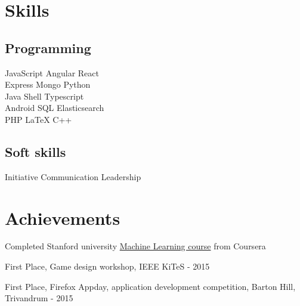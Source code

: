 \documentclass[]{font}
\begin{document}
%
%
\lastupdated

%
%

%
%

\begin{minipage}[t]{0.33\textwidth} 


\section{Skills}
\subsection{Programming}
JavaScript \textbullet{} Angular \textbullet{} React \\
Express \textbullet{}  Mongo \textbullet{} Python \\
Java \textbullet{} Shell \textbullet{} Typescript \\ 
Android \textbullet{} SQL \textbullet{} Elasticsearch \\
PHP \textbullet{} \LaTeX \textbullet{} C++\\
\sectionsep

\subsection{Soft skills}
Initiative \textbullet{} Communication \textbullet{} Leadership \\
\sectionsep


\section{Achievements} 
\vspace{\topsep}
\begin{tightemize}
\item Completed Stanford university \href{https://www.coursera.org/account/accomplishments/records/EJQWCKEBUSBD}{Machine Learning course} from Coursera
\item First Place, Game design workshop, IEEE KiTeS - 2015
\item First Place, Firefox Appday, application development competition, Barton Hill, Trivandrum - 2015
\end{tightemize}
\sectionsep


\end{minipage}
\end{document}
